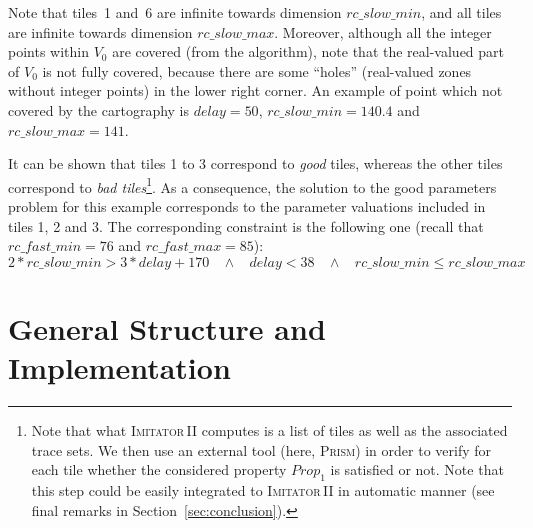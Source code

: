 \documentclass[a4paper,10pt]{article}
\newcommand{\rcpFMax}{\mathit{rc\_fast\_max}}
\newcommand{\rcpFMin}{\mathit{rc\_fast\_min}}
\newcommand{\rcpSMax}{\mathit{rc\_slow\_max}}
\newcommand{\rcpSMin}{\mathit{rc\_slow\_min}}
\newcommand{\rcpD}{\mathit{delay}}
\newcommand{\imitatordeux}{\textsc{Imitator}\,II}
\newcommand{\prism}{\textsc{Prism}}
\begin{document}
Note that tiles~1 and~6 are infinite towards dimension $\rcpSMin$, and all tiles are infinite towards dimension $\rcpSMax$.
Moreover, although all the integer points within $V_0$ are covered (from the algorithm), note that the real-valued part of $V_0$ is not fully covered, because there are some ``holes'' (real-valued zones without integer points) in the lower right corner.
An example of point which not covered by the cartography is $\rcpD = 50$, $\rcpSMin = 140.4$ and $\rcpSMax = 141$.

It can be shown that tiles 1 to 3 correspond to \emph{good} tiles, whereas the other tiles correspond to \emph{bad tiles}\footnote{Note that what \imitatordeux{} computes is a list of tiles as well as the associated trace sets.
We then use an external tool (here, \prism{}) in order to verify for each tile whether the considered property $\mathit{Prop}_1$ is satisfied or not.
Note that this step could be easily integrated to \imitatordeux{} in automatic manner (see final remarks in Section~\ref{sec:conclusion}).}.
As a consequence, the solution to the good parameters problem for this example corresponds to the parameter valuations included in tiles 1, 2 and 3.
The corresponding constraint is the following one (recall that $\rcpFMin = 76$ and $\rcpFMax = 85$):
$$ 2 * \rcpSMin > 3 * \rcpD + 170 \ \ \ \ \land \ \ \ \ \rcpD < 38 \ \ \ \ \land \ \ \ \ \rcpSMin \leq \rcpSMax$$









\section{General Structure and Implementation} \label{sec:implementation}
\end{document}
